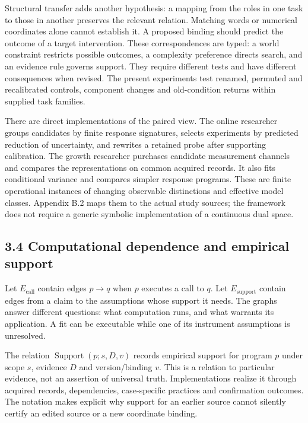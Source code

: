 \documentclass[twoside,11pt]{article}
\begin{document}
Structural transfer adds another hypothesis: a mapping from the roles in one task to those in another preserves the relevant relation. Matching words or numerical coordinates alone cannot establish it. A proposed binding should predict the outcome of a target intervention. These correspondences are typed: a world constraint restricts possible outcomes, a complexity preference directs search, and an evidence rule governs support. They require different tests and have different consequences when revised. The present experiments test renamed, permuted and recalibrated controls, component changes and old-condition returns within supplied task families.


There are direct implementations of the paired view. The online researcher groups candidates by finite response signatures, selects experiments by predicted reduction of uncertainty, and rewrites a retained probe after supporting calibration. The growth researcher purchases candidate measurement channels and compares the representations on common acquired records. It also fits conditional variance and compares simpler response programs. These are finite operational instances of changing observable distinctions and effective model classes. Appendix B.2 maps them to the actual study sources; the framework does not require a generic symbolic implementation of a continuous dual space.


\subsection*{3.4 Computational dependence and empirical support}

Let \(E_{\mathrm{call}}\) contain edges \(p\to q\) when \(p\) executes a call to \(q\). Let \(E_{\mathrm{support}}\) contain edges from a claim to the assumptions whose support it needs. The graphs answer different questions: what computation runs, and what warrants its application. A fit can be executable while one of its instrument assumptions is unresolved.


The relation \(\operatorname{Support}(p;s,D,v)\) records empirical support for program \(p\) under scope \(s\), evidence \(D\) and version/binding \(v\). This is a relation to particular evidence, not an assertion of universal truth. Implementations realize it through acquired records, dependencies, case-specific practices and confirmation outcomes. The notation makes explicit why support for an earlier source cannot silently certify an edited source or a new coordinate binding.
\end{document}
